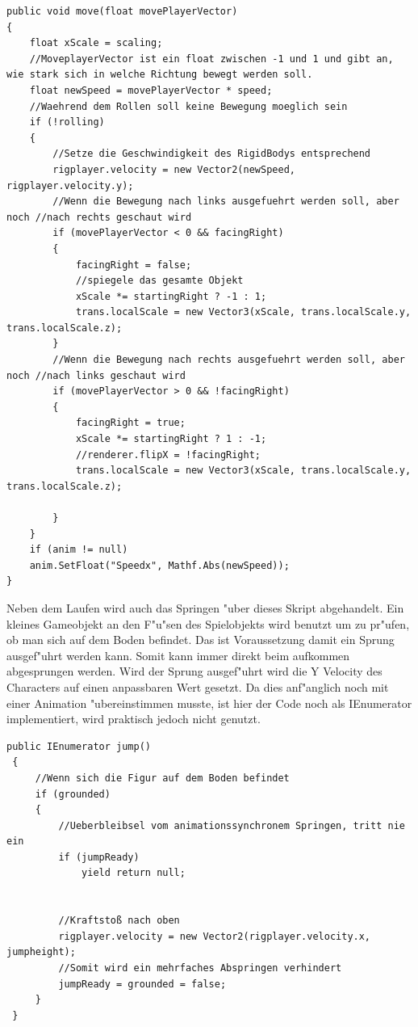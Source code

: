 \begin{lstlisting}[breaklines=true] 
public void move(float movePlayerVector)
{
	float xScale = scaling;
	//MoveplayerVector ist ein float zwischen -1 und 1 und gibt an, wie stark sich in welche Richtung bewegt werden soll.
	float newSpeed = movePlayerVector * speed;
	//Waehrend dem Rollen soll keine Bewegung moeglich sein
	if (!rolling)
	{
		//Setze die Geschwindigkeit des RigidBodys entsprechend
		rigplayer.velocity = new Vector2(newSpeed, rigplayer.velocity.y);
		//Wenn die Bewegung nach links ausgefuehrt werden soll, aber noch //nach rechts geschaut wird
		if (movePlayerVector < 0 && facingRight)
		{
			facingRight = false;
			//spiegele das gesamte Objekt 
			xScale *= startingRight ? -1 : 1;
			trans.localScale = new Vector3(xScale, trans.localScale.y, trans.localScale.z);
		}
		//Wenn die Bewegung nach rechts ausgefuehrt werden soll, aber noch //nach links geschaut wird
		if (movePlayerVector > 0 && !facingRight)
		{
			facingRight = true;
			xScale *= startingRight ? 1 : -1;
			//renderer.flipX = !facingRight;
			trans.localScale = new Vector3(xScale, trans.localScale.y, trans.localScale.z);
			
		}
	}
	if (anim != null)
	anim.SetFloat("Speedx", Mathf.Abs(newSpeed));
}
\end{lstlisting}

Neben dem Laufen wird auch das Springen "uber dieses Skript abgehandelt.
Ein kleines Gameobjekt an den F"u"sen des Spielobjekts wird benutzt um zu pr"ufen, ob man sich auf dem Boden befindet. Das ist Voraussetzung damit ein Sprung ausgef"uhrt werden kann. Somit kann immer direkt beim aufkommen abgesprungen werden. Wird der Sprung ausgef"uhrt wird die Y Velocity des Characters auf einen anpassbaren Wert gesetzt.
Da dies anf"anglich noch mit einer Animation "ubereinstimmen musste, ist hier der Code noch als IEnumerator implementiert, wird praktisch jedoch nicht genutzt.

\begin{lstlisting}[breaklines=true]
 public IEnumerator jump()
 {
	 //Wenn sich die Figur auf dem Boden befindet
	 if (grounded)
	 {
		 //Ueberbleibsel vom animationssynchronem Springen, tritt nie ein
		 if (jumpReady)
			 yield return null;  
			 
			 
		 //Kraftstoß nach oben
		 rigplayer.velocity = new Vector2(rigplayer.velocity.x, jumpheight);
		 //Somit wird ein mehrfaches Abspringen verhindert
		 jumpReady = grounded = false;
	 }
 }
\end{lstlisting}


